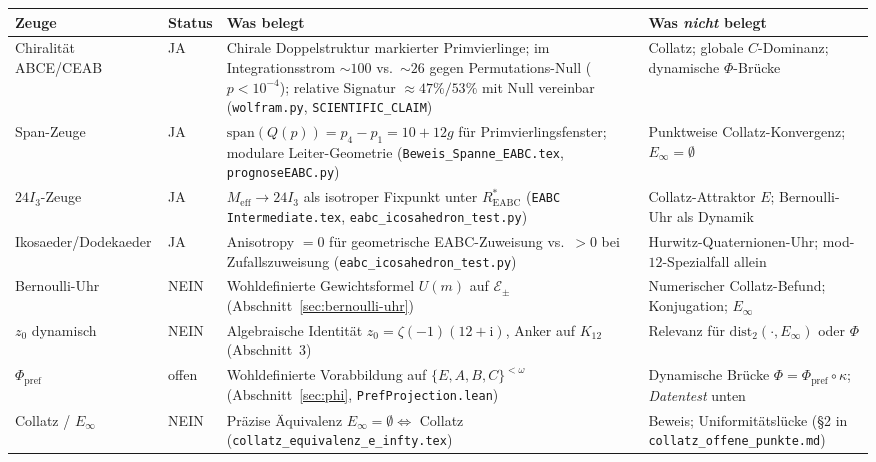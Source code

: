 \documentclass[11pt,a4paper]{article}
\theoremstyle{definition}
\theoremstyle{remark}
\newcommand{\Einf}{E_{\infty}}
\newcommand{\dist}{\mathrm{dist}}
\newcommand{\SigmaEABC}{\{E,A,B,C\}}
\newcommand{\Phpref}{\Phi_{\mathrm{pref}}}
\begin{document}
\begin{center}
  \small
  \begin{tabular}{@{}p{2.6cm}p{1.4cm}p{4.8cm}p{4.8cm}@{}}
    \toprule
    Zeuge & Status & Was belegt & Was \emph{nicht} belegt \\
    \midrule
    Chiralität ABCE/CEAB &
    JA &
    Chirale Doppelstruktur markierter Primvierlinge; im Integrationsstrom
    $\sim\!100$ vs.\ $\sim\!26$ gegen Permutations-Null ($p<10^{-4}$);
    relative Signatur $\approx 47\%/53\%$ mit Null vereinbar
    (\texttt{wolfram.py}, \texttt{SCIENTIFIC\_CLAIM}) &
    Collatz; globale $C$-Dominanz; dynamische $\Phi$-Brücke \\
    \addlinespace
    Span-Zeuge &
    JA &
    $\mathrm{span}(Q(p))=p_4-p_1=10+12g$ für Primvierlingsfenster;
    modulare Leiter-Geometrie (\texttt{Beweis\_Spanne\_EABC.tex},
    \texttt{prognoseEABC.py}) &
    Punktweise Collatz-Konvergenz; $\Einf=\emptyset$ \\
    \addlinespace
  $24I_3$-Zeuge &
    JA &
    $M_{\mathrm{eff}}\to 24I_3$ als isotroper Fixpunkt unter
    $R^*_{\mathrm{EABC}}$ (\texttt{EABC Intermediate.tex},
    \texttt{eabc\_icosahedron\_test.py}) &
    Collatz-Attraktor $E$; Bernoulli-Uhr als Dynamik \\
    \addlinespace
    Ikosaeder/Dodekaeder &
    JA &
    Anisotropy $=0$ für geometrische EABC-Zuweisung vs.\ $>0$ bei
    Zufallszuweisung (\texttt{eabc\_icosahedron\_test.py}) &
    Hurwitz-Quaternionen-Uhr; mod-$12$-Spezialfall allein \\
    \midrule
    Bernoulli-Uhr &
    NEIN &
    Wohldefinierte Gewichtsformel $U(m)$ auf $\mathcal{E}_\pm$
    (Abschnitt~\ref{sec:bernoulli-uhr}) &
    Numerischer Collatz-Befund; Konjugation; $\Einf$ \\
    \addlinespace
    $z_0$ dynamisch &
    NEIN &
    Algebraische Identität $z_0=\zeta(-1)(12+\mathrm{i})$,
    Anker auf $K_{12}$ (Abschnitt~3) &
    Relevanz für $\dist_2(\cdot,\Einf)$ oder $\Phi$ \\
    \addlinespace
    $\Phpref$ &
    offen &
    Wohldefinierte Vorabbildung auf $\SigmaEABC^{<\omega}$
    (Abschnitt~\ref{sec:phi}, \texttt{PrefProjection.lean}) &
    Dynamische Brücke $\Phi=\Phpref\circ\kappa$;
    \emph{Datentest} unten \\
    \addlinespace
    Collatz / $\Einf$ &
    NEIN &
    Präzise Äquivalenz $\Einf=\emptyset\Leftrightarrow$ Collatz
    (\texttt{collatz\_equivalenz\_e\_infty.tex}) &
    Beweis; Uniformitätslücke (§2 in
    \texttt{collatz\_offene\_punkte.md}) \\
    \bottomrule
  \end{tabular}
\end{center}
\end{document}
